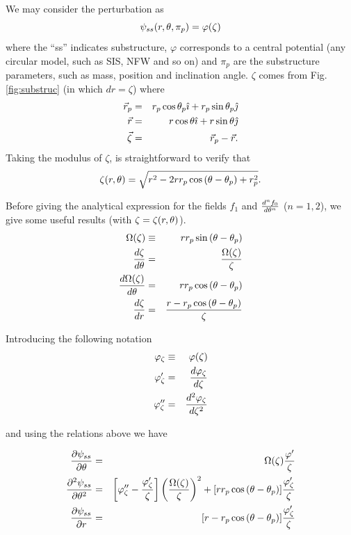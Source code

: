 We may consider the perturbation as
\begin{equation}
\psi_{ss}(r,\theta,\pi_p)=\varphi(\zeta)
\end{equation}
where the ``ss'' indicates substructure, $\varphi$ corresponds to a central potential (any circular model, such as SIS, NFW and so on) and $\pi_p$
are the substructure parameters, such as mass, position and inclination angle. $\zeta$ comes from Fig. \ref{fig:substruc} (in which $dr=\zeta$)
where
\begin{eqnarray}
\vec{r}_p&=&r_p\cos{\theta_p}\hat{\imath} + r_p\sin{\theta_p}\hat{\jmath}\\
\vec{r}&=&r\cos{\theta}\hat{\imath} + r\sin{\theta}\hat{\jmath}\\
\vec{\zeta}&=&\vec{r}_p-\vec{r}.
\end{eqnarray}
Taking the modulus of $\zeta$, is straightforward to verify that
\begin{equation}
\zeta(r,\theta)=\sqrt{r^2-2r r_p\cos{(\theta-\theta_p)}+r^2_p}.
\label{xirte}
\end{equation}

Before giving the analytical expression for the fields $f_1$ and ${d^nf_0 \over d\theta^n}$ ($n=1,2$), we
give some useful results (with $\zeta = \zeta(r,\theta)$).
\begin{eqnarray}
\Omega(\zeta) & \equiv & r r_p \sin{(\theta-\theta_p)} \\
\dfrac{d\zeta}{d\theta}&=&  \dfrac{\Omega(\zeta)}{\zeta}\\
\dfrac{d\Omega(\zeta)}{d\theta}&=&r r_p\cos{(\theta-\theta_p)}\\
\dfrac{d\zeta}{dr}&=&\dfrac{r-r_p\cos{(\theta-\theta_p)}}{\zeta}
\end{eqnarray}

Introducing the following notation
\begin{eqnarray}
\varphi_\zeta & \equiv & \varphi(\zeta) \nonumber \\
\varphi^\prime_\zeta &=& d\varphi_\zeta \over d\zeta \nonumber  \\
\varphi^{\prime\prime}_\zeta &=& d^2\varphi_\zeta \over d\zeta^2 \nonumber 
\end{eqnarray}

and using the relations above we have

\begin{eqnarray}
\dfrac{\prtl \psi_{ss}}{\prtl \te}&=&\Omega(\zeta)\dfrac{\varphi^\prime}{\zeta}\label{df0}\\
\dfrac{\prtl^2 \psi_{ss}}{\prtl\te^2}&=&\left[\varphi^{\prime\prime}_\zeta-\dfrac{\varphi^\prime_\zeta}{\zeta}\right]%
\left(\dfrac{\Omega(\zeta)}{\zeta}\right)^2+[r r_p\cos{(\te-\tep)}]\dfrac{\varphi^\prime_\zeta}{\zeta}\label{ddf0}\\
\dfrac{\prtl \psi_{ss}}{\prtl r}&=&[r-r_p\cos{(\te-\tep)}]\dfrac{\varphi^\prime_\zeta}{\zeta}\label{f1}
\end{eqnarray}

